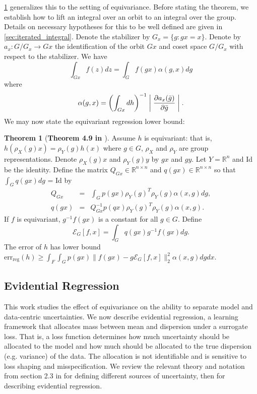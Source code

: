 \documentclass[10pt]{article} %
\newenvironment{customthm}[1][]
{%
    \begin{thm}[\normalfont\textbf{#1}] %
}
{%
    \end{thm}
}
\theoremstyle{definition}
\newtheorem{thm}{Theorem}
\begin{document}
\cref{thm:equivareg} generalizes this to the setting of equivariance. Before stating the theorem, we establish how to lift an integral over an orbit to an integral over the group. Details on necessary hypotheses for this to be well defined are given in \cref{sec:iterated_integral}. Denote the stabilizer by $G_x = \{g: gx = x\}$. Denote by $a_x: G/G_x \to Gx$ the identification of the orbit $Gx$ and coset space $G/G_x$ with respect to the stabilizer. We have
%
\begin{equation*}
    \int_{Gx}f(z) dz = \int_G f(gx)\alpha(g,x)dg
\end{equation*}
%
where 
\begin{equation*}
    \alpha(g,x) = \left(\int_{Gx}dh\right)^{-1} \biggm|\frac{\partial a_x(\bar{g})}{\partial \bar{g}}\biggm|.
\end{equation*}
%
We may now state the equivariant regression lower bound:
\begin{customthm}[Theorem 4.9 in \cite{wang2024general}] \label{thm:equivareg} Assume $h$ is equivariant: that is, $h(\rho_X(g)x) = \rho_Y(g)h(x)$ where $g \in G$, $\rho_X$ and $\rho_Y$ are group representations. Denote $\rho_X(g)x$ and $\rho_Y(g)y$ by $gx$ and $gy$. Let $Y = \mathbb{R}^n$ and Id be the identity. Define the matrix
$Q_{Gx} \in \mathbb{R}^{n\times n}$ and $q(gx) \in \mathbb{R}^{n\times n}$ so that $\int_G q(gx)dg$ = Id by
%
\begin{eqnarray*}
Q_{Gx} &=& \int_G p(gx) \rho_Y(g)^T \rho_Y(g) \alpha(x,g) dg, \\
q(gx) &=& Q^{-1}_{Gx}p(qx) \rho_Y(g)^T \rho_Y(g) \alpha(x,g).
\end{eqnarray*}
%
If $f$ is equivariant, $g^{-1}f(gx)$ is a constant for all $g \in G$. Define  
%
\begin{equation*}
    \mathcal{E}_G[f,x] = \int_G q(gx)g^{-1}f(gx)dg.
\end{equation*}
%
The error of $h$ has lower bound $\text{err}_{\text{reg}}(h) \geq \int_F \int_G p(gx) \lVert f(gx) - g\mathcal{E}_G[f,x]\rVert_2^2 \alpha(x,g)dgdx$.

\end{customthm}

\subsection{Evidential Regression}
\label{sec:der}

This work studies the effect of equivariance on the ability to separate model and data-centric uncertainties. We now describe evidential regression, a learning framework that allocates mass between mean and dispersion under a surrogate loss. That is, a loss function determines how much uncertainty should be allocated to the model and how much should be allocated to the true dispersion (e.g. variance) of the data. The allocation is not identifiable and is sensitive to loss shaping and misspecification. We review the relevant theory and notation from section 2.3 in \cite{hullermeier2021aleatoric} for defining different sources of uncertainty, then \cite{amini2020deep} for describing evidential regression.
\end{document}

